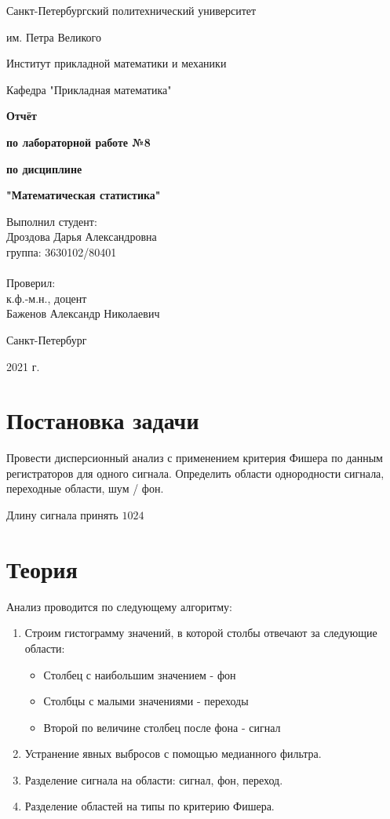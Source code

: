 \documentclass[a4paper, 12pt]{article}
\begin{document}
\begin{titlepage}
  \centerline {Санкт-Петербургский политехнический университет}
  \centerline { им. Петра Великого}
  \centerline { }
  \centerline {Институт прикладной математики и механики} 
  \centerline {Кафедра "Прикладная математика"}
  \vfill
  \centerline{\textbf{Отчёт}}
  \centerline{\textbf{по лабораторной работе №8}}
  \centerline{\textbf{по дисциплине}}
  \centerline{\textbf{"Математическая статистика"}}
  \vfill
  \hfill
  \begin{minipage}{0.45\textwidth}
  Выполнил студент:\\
  Дроздова Дарья Александровна\\
  группа: 3630102/80401 \\
  \\
  Проверил:\\
  к.ф.-м.н., доцент \\
  Баженов Александр Николаевич
  \end{minipage}
  \vfill
  \centerline {Санкт-Петербург}   
  \centerline {2021 г.}  
\end{titlepage}

\newpage
\setcounter{page}{2}
\tableofcontents

\newpage
\listoffigures

\newpage
\listoftables

\newpage
\section{Постановка задачи}

Провести дисперсионный анализ с применением критерия Фишера по данным регистраторов для одного сигнала. Определить области однородности сигнала, переходные области, шум / фон.

Длину сигнала принять $1024$

\newpage
\section{Теория}

Анализ проводится по следующему алгоритму:
\begin{enumerate}
	\item Строим гистограмму значений, в которой столбы отвечают за следующие области:
	\begin{itemize}
		\item Столбец с наибольшим значением - фон
		\item Столбцы с малыми значениями - переходы
		\item Второй по величине столбец после фона - сигнал
	\end{itemize}
	\item Устранение явных выбросов с помощью медианного фильтра.
	\item Разделение сигнала на области: сигнал, фон, переход.
	\item Разделение областей на типы по критерию Фишера.
\end{enumerate}
\end{document}
